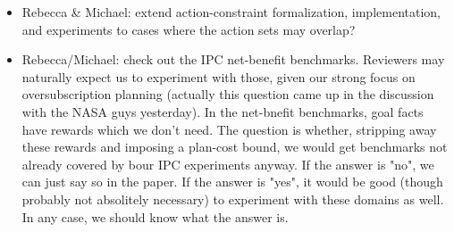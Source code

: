 \documentclass{article}
\begin{document}

\begin{itemize}
\item Rebecca \& Michael: extend action-constraint formalization, implementation, and experiments to cases where the action sets may overlap?
\item Rebecca/Michael: check out the IPC net-benefit benchmarks. Reviewers may naturally expect us to experiment with those, given our strong focus on oversubscription planning (actually this question came up in the discussion with the NASA guys yesterday). In the net-bnefit benchmarks, goal facts have rewards which we don't need. The question is whether, stripping away these rewards and imposing a plan-cost bound, we would get benchmarks not already covered by bour IPC experiments anyway. If the answer is "no", we can just say so in the paper. If the answer is "yes", it would be good (though probably not absolitely necessary) to experiment with these domains as well. In any case, we should know what the answer is.
\end{itemize}
\end{document}
